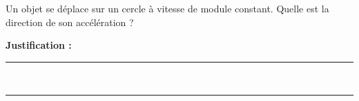 Un objet se déplace sur un cercle à vitesse de module constant. Quelle est la direction de son accélération ?

\choices

\noindent\textbf{Justification :} \hrulefill \\[2.5ex]
\rule{\linewidth}{0.4pt} \\[2.5ex]
\rule{\linewidth}{0.4pt}
\vfill
